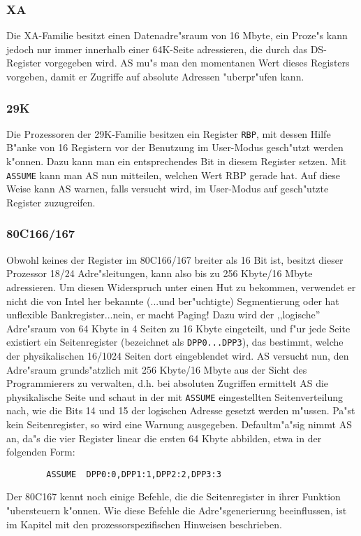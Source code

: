 \documentclass[12pt,a4paper,twoside]{report}
\newcommand{\tty}[1]{{\tt #1}}
\begin{document}
{%

\subsubsection{XA}

Die XA-Familie besitzt einen Datenadre"sraum von 16 Mbyte, ein Proze"s
kann jedoch nur immer innerhalb einer 64K-Seite adressieren, die 
durch das DS-Register vorgegeben wird.  AS mu"s man den momentanen
Wert dieses Registers vorgeben, damit er Zugriffe auf absolute 
Adressen "uberpr"ufen kann.


\subsubsection{29K}

Die Prozessoren der 29K-Familie besitzen ein Register \tty{RBP}, mit dessen
Hilfe B"anke von 16 Registern vor der Benutzung im User-Modus gesch"utzt
werden k"onnen.  Dazu kann man ein entsprechendes Bit in diesem Register
setzen.  Mit \tty{ASSUME} kann man AS nun mitteilen, welchen Wert RBP
gerade hat.  Auf diese Weise kann AS warnen, falls versucht wird, im
User-Modus auf gesch"utzte Register zuzugreifen.


\subsubsection{80C166/167}

Obwohl keines der Register im 80C166/167 breiter als 16 Bit ist, besitzt
dieser Prozessor 18/24 Adre"sleitungen, kann also bis zu 256 Kbyte/16 Mbyte
adressieren.  Um diesen Widerspruch unter einen Hut zu bekommen, verwendet
er nicht die von Intel her bekannte (...und ber"uchtigte) Segmentierung oder
hat unflexible Bankregister...nein, er macht Paging!  Dazu wird der ,,logische''
Adre"sraum von 64 Kbyte in 4 Seiten zu 16 Kbyte eingeteilt, und f"ur jede
Seite existiert ein Seitenregister (bezeichnet als \tty{DPP0...DPP3}), das
bestimmt, welche der physikalischen 16/1024 Seiten dort eingeblendet wird.  AS versucht
nun, den Adre"sraum grunds"atzlich mit 256 Kbyte/16 Mbyte aus der Sicht des
Programmierers zu verwalten, d.h. bei absoluten Zugriffen ermittelt AS die
physikalische Seite und schaut in der mit \tty{ASSUME} eingestellten
Seitenverteilung nach, wie die Bits 14 und 15 der logischen Adresse gesetzt
werden m"ussen.  Pa"st kein Seitenregister, so wird eine Warnung ausgegeben.
Defaultm"a"sig nimmt AS an, da"s die vier Register linear die ersten 64 Kbyte
abbilden, etwa in der folgenden Form:
\begin{verbatim}
        ASSUME  DPP0:0,DPP1:1,DPP2:2,DPP3:3
\end{verbatim}
Der 80C167 kennt noch einige Befehle, die die Seitenregister in ihrer
Funktion "ubersteuern k"onnen.  Wie diese Befehle die Adre"sgenerierung
beeinflussen, ist im Kapitel mit den prozessorspezifischen Hinweisen
beschrieben.

}
\end{document}
